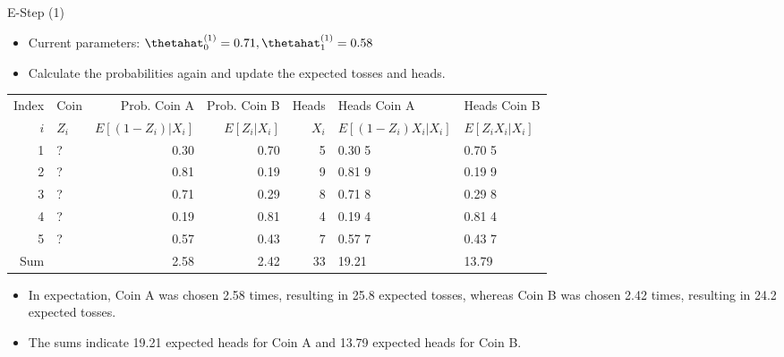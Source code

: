 \documentclass[dvipdfmx,bigger,aspectratio=169]{beamer}
\begin{document}
\begin{frame}[allowframebreaks,label=,t]{E-Step (1)}
\begin{itemize}
\item Current parameters: \(\thetahat_{0}^{(1)} = 0.71, \thetahat_{1}^{(1)} = 0.58\)
\item Calculate the probabilities again and update the expected tosses and heads.
\end{itemize}
\footnotesize
\begin{center}
\begin{tabular}{r|l|rr|r|ll|}
Index & Coin & Prob. Coin A & Prob. Coin B & Heads & Heads Coin A & Heads Coin B\\
\(i\) & \(Z_{i}\) & \(E[(1-Z_{i})\vert X_{i}]\) & \(E[Z_{i}\vert X_{i}]\) & \(X_{i}\) & \(E[(1-Z_{i}) X_{i} \vert X_{i}]\) & \(E[Z_{i} X_{i} \vert X_{i}]\)\\
\hline
1 & ? & 0.30 & 0.70 & 5 & 0.30 \texttimes{} 5 & 0.70 \texttimes{} 5\\
2 & ? & 0.81 & 0.19 & 9 & 0.81 \texttimes{} 9 & 0.19 \texttimes{} 9\\
3 & ? & 0.71 & 0.29 & 8 & 0.71 \texttimes{} 8 & 0.29 \texttimes{} 8\\
4 & ? & 0.19 & 0.81 & 4 & 0.19 \texttimes{} 4 & 0.81 \texttimes{} 4\\
5 & ? & 0.57 & 0.43 & 7 & 0.57 \texttimes{} 7 & 0.43 \texttimes{} 7\\
\hline
Sum &  & 2.58 & 2.42 & 33 & 19.21 & 13.79\\
\end{tabular}
\end{center}
\normalsize
\begin{itemize}
\item In expectation, Coin A was chosen 2.58 times, resulting in 25.8 expected tosses, whereas Coin B was chosen 2.42 times, resulting in 24.2 expected tosses.
\item The sums indicate 19.21 expected heads for Coin A and 13.79 expected heads for Coin B.
\end{itemize}
\end{frame}
\end{document}
